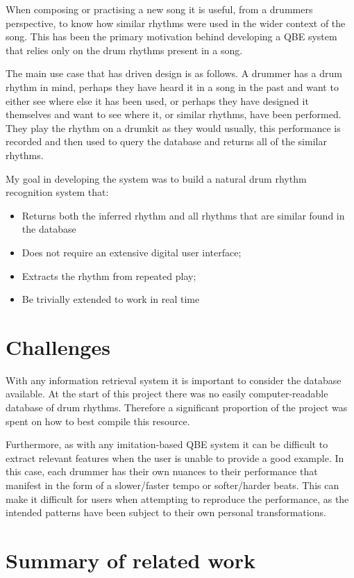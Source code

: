 \documentclass[12pt,twoside,notitlepage]{report}
\begin{document}
	When composing or practising a new song it is useful, from a drummers perspective, to know how similar rhythms were used in the wider context of the song. This has been the primary motivation behind developing a QBE system that relies only on the drum rhythms present in a song. 
	
	The main use case that has driven design is as follows. A drummer has a drum rhythm in mind, perhaps they have heard it in a song in the past and want to either see where else it has been used, or perhaps they have designed it themselves and want to see where it, or similar rhythms, have been performed. They play the rhythm on a drumkit as they would usually, this performance is recorded and then used to query the database and returns all of the similar rhythms.
	
	My goal in developing the system was to build a natural drum rhythm recognition system that:
	\begin{itemize}
		\item{Returns both the inferred rhythm and all rhythms that are similar found in the database}
		\item{Does not require an extensive digital user interface;}
		\item{Extracts the rhythm from repeated play;}
		\item{Be trivially extended to work in real time}
	\end{itemize}	

	\section{Challenges}
	With any information retrieval system it is important to consider the database available. At the start of this project there was no easily computer-readable database of drum rhythms. Therefore a significant proportion of the project was spent on how to best compile this resource.
	
	Furthermore, as with any imitation-based QBE system it can be difficult to extract relevant features when the user is unable to provide a good example. In this case, each drummer has their own nuances to their performance that manifest in the form of a slower/faster tempo or softer/harder beats. This can make it difficult for users when attempting to reproduce the performance, as the intended patterns have been subject to their own personal transformations.
	
	
	\section{\label{sec:SummaryOfRelatedWork}Summary of related work}
	
\end{document}
